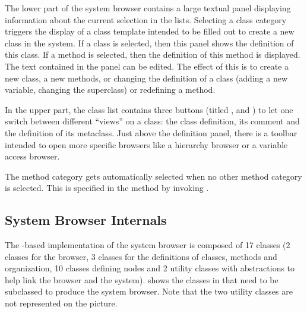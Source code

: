 \documentclass[a4paper,10pt,twoside]{book}
\begin{document}
The lower part of the system browser contains a large textual panel displaying information about the current selection in the lists. Selecting a class category triggers the display of a class template intended to be filled out to create a new class in the system. If a class is selected, then this panel shows the definition of this class. If a method is selected, then the definition of this method is displayed. The text contained in the panel can be edited. The effect of this is to create a new class, a new methods, or changing the definition of a class (\eg adding a new variable, changing the superclass) or redefining a method.

In the upper part, the class list contains three buttons (titled ,  and ) to let one switch between different ``views'' on a class: the class definition, its comment and the definition of its metaclass. Just above the definition panel, there is a toolbar intended to open more specific browsers like a hierarchy browser or a variable access browser.

The  method category gets automatically selected when no other method category is selected. This is specified in the  method by invoking .

\subsection{System Browser Internals}
The \ob-based implementation of the \pharo system browser is composed of 17 classes (2 classes for the browser, 3 classes for the definitions of classes, methods and organization, 10 classes defining nodes and 2 utility classes with abstractions to help link the browser and the system).  shows the classes in \obf that need to be subclassed to produce the system browser. Note that the two utility classes are not represented on the picture.



\end{document}
